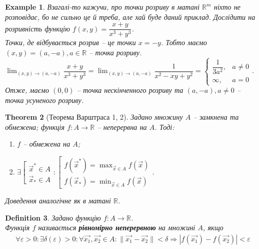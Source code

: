 \documentclass[a4paper, 10pt]{article}
\theoremstyle{theoremdd}
\newtheorem{theorem}{Theorem}[subsection]
\theoremstyle{theoremdd}
\theoremstyle{theoremdd}
\newtheorem{definition}[theorem]{Definition}
\theoremstyle{theoremdd}
\theoremstyle{theoremdd}
\newtheorem{example}[theorem]{Example}
\theoremstyle{theoremdd}
\theoremstyle{theoremdd}
\theoremstyle{theoremdd}
\theoremstyle{theoremdd}
\newcommand\Norm[1]{\|#1\|}
\begin{document}
\begin{example}
Взагалі-то кажучи, про точки розриву в матані $\mathbb{R}^m$ ніхто не розповідає, бо не сильно це й треба, але хай буде даний приклад. Дослідити на розривність функцію $f(x,y) = \dfrac{x+y}{x^3+y^3}$.\\
Точки, де відбувається розрив -- це точки $x = -y$. Тобто маємо $(x,y) = (a,-a), a \in \mathbb{R}$ -- точка розриву.\\
$\displaystyle\lim_{(x,y) \to (a,-a)} \dfrac{x+y}{x^3+y^3} = \lim_{(x,y) \to (a,-a)} \dfrac{1}{x^2-xy+y^2} = \begin{cases} \dfrac{1}{3a^2}, & a \neq 0 \\ \infty, & a = 0 \end{cases} $.\\
Отже, маємо $(0,0)$ -- точка нескінченного розриву та $(a,-a), a \neq 0$ -- точка усуненого розриву.
\end{example}

\begin{theorem}[Теорема Варштраса 1, 2]
Задано множину $A$ -- замкнена та обмежена; функція $f \colon A \to \mathbb{R}$ -- неперервна на $A$. Тоді:
\begin{enumerate}
\item $f$ -- обмежена на $A$;
\item $\exists \left[ \begin{gathered} \vec{x}^* \in A \\ \vec{x}_* \in A \end{gathered} \right. : \left[ \begin{gathered} f(\vec{x}^*) = \max_{\vec{x} \in A} f(\vec{x}) \\ f(\vec{x}_*) = \min_{\vec{x} \in A} f(\vec{x}) \end{gathered} \right.$.
\end{enumerate}
\textit{Доведення аналогічне як в матані $\mathbb{R}$.}
\end{theorem}

\begin{definition}
Задано функцію $f \colon A \to \mathbb{R}$.\\
Функція $f$ називається \textbf{рівномірно неперервною} на множині $A$, якщо
\begin{align*}
\forall \varepsilon > 0: \exists \delta(\varepsilon) > 0: \forall \vec{x_1}, \vec{x_2} \in A: \Norm{\vec{x_1} - \vec{x_2}} < \delta \Rightarrow |f(\vec{x_1}) - f(\vec{x_2})| < \varepsilon 
\end{align*}
\end{definition}
\end{document}
